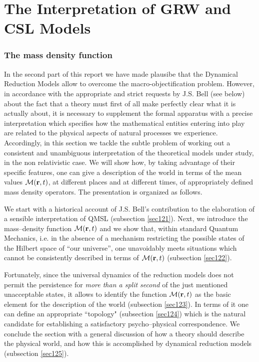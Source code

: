 \documentclass[10pt,a4paper]{article}
\begin{document}
\part{The Interpretation of GRW and CSL Models}

\section{The mass density function} \label{sec012}

    In the second part of this report we have made plausibe that the
Dynamical Reduction Models allow to overcome the macro-objectification
problem. However, in accordance with the appropriate and strict requests
by J.S. Bell (see below) about the fact that a theory must first of
all make  perfectly clear what it is actually about, it is necessary to
supplement the formal apparatus with a precise interpretation which
specifies how the mathematical entities entering into play are related to
the physical aspects of natural processes we experience.
Accordingly, in this section we tackle the subtle problem of working out a
consistent and unambiguous interpretation of the theoretical  models
under study, in the non relativistic case. We will show how, by taking
advantage of their specific features, one can give a description of the
world in terms of the mean values ${\mathcal M}({\bf r},t)$, at different
places and at different times, of appropriately defined mass density
operators. The presentation is organized as follows.

We start with a historical account of J.S. Bell's contribution to
the elaboration of a sensible interpretation of QMSL (subsection
\ref{sec121}). Next, we introduce the mass--density function
${\mathcal M}({\bf r},t)$ and we show that, within standard
Quantum Mechanics, i.e. in the absence of a mechanism restricting
the possible states of the Hilbert space of ``our universe'', one
unavoidably meets situations which cannot be consistently
described in terms of ${\mathcal M}({\bf r},t)$ (subsection
\ref{sec122}).

Fortunately, since the universal dynamics of the reduction models
does not permit  the persistence for \cite{bells} {\it more than a
split second} of the just mentioned unacceptable states, it allows  to
identify the function ${\mathcal M}({\bf r},t)$ as the basic element for
the description of the world (subsection \ref{sec123}). In terms of it
one can  define an appropriate ``topology" (subsection
\ref{sec124}) which is the natural candidate for establishing a
satisfactory psycho--physical correspondence. We conclude the
section with a general discussion of how a theory should describe
the physical world, and how this is accomplished by dynamical
reduction models (subsection \ref{sec125}).
\end{document}
